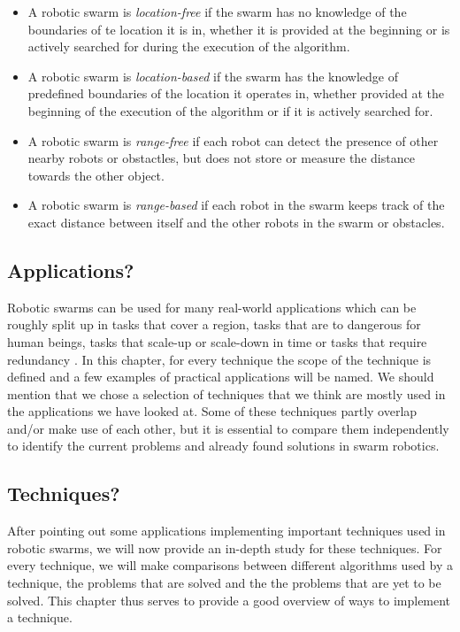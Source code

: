   \begin{itemize}
    \item A robotic swarm is \emph{location-free} if the swarm has no knowledge of the boundaries of te location it is in, whether it is provided at the beginning or is actively searched for during the execution of the algorithm. 
    \item A robotic swarm is \emph{location-based} if the swarm has the knowledge of predefined boundaries of the location it operates in, whether provided at the beginning of the execution of the algorithm or if it is actively searched for. 
    \item A robotic swarm is \emph{range-free} if each robot can detect the presence of other nearby robots or obstactles, but does not store or measure the distance towards the other object.
    \item A robotic swarm is \emph{range-based} if each robot in the swarm keeps track of the exact distance between itself and the other robots in the swarm or obstacles. 
  \end{itemize}

 \subsection{Applications?}
 Robotic swarms can be used for many real-world applications which can be roughly split up in tasks that cover a region, tasks that are to dangerous for human beings, tasks that scale-up or scale-down in time or tasks that require redundancy \cite{csahin2005swarm}. In this chapter, for every technique the scope of the technique is defined and a few examples of practical applications will be named. We should mention that we chose a selection of techniques that we think are mostly used in the applications we have looked at. Some of these techniques partly overlap and/or make use of each other, but it is essential to compare them independently to identify the current problems and already found solutions in swarm robotics.

 \subsection{Techniques?}
After pointing out some applications implementing important techniques used in robotic swarms, we will now provide an in-depth study for these techniques. For every technique, we will make comparisons between different algorithms used by a technique, the problems that are solved and the the problems that are yet to be solved. This chapter thus serves to provide a good overview of ways to implement a technique. 
